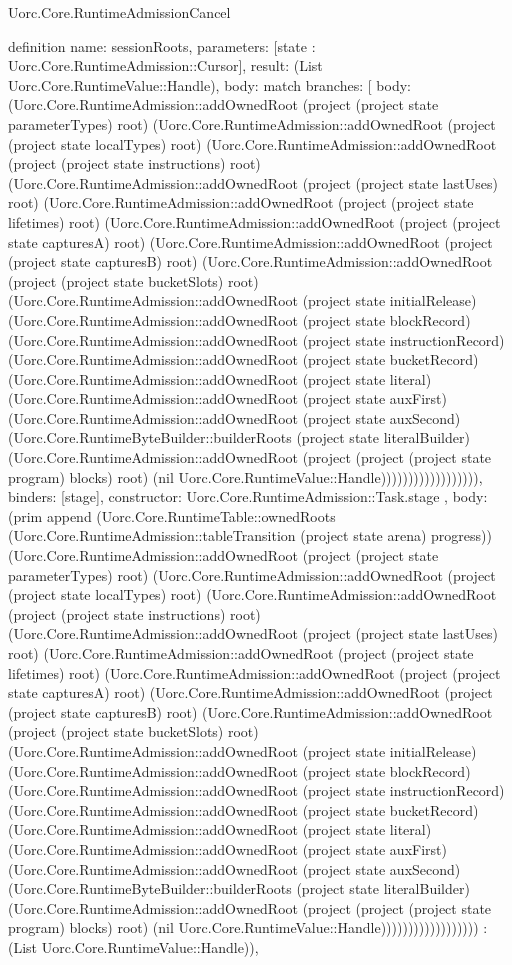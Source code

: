\begin{lexlean}{Uorc.Core.RuntimeAdmissionCancel}
\begin{semanticmodule}
definition{
  name: sessionRoots,
  parameters: [state : Uorc.Core.RuntimeAdmission::Cursor],
  result: (List Uorc.Core.RuntimeValue::Handle),
  body: match{
    branches: [
      {
        body: (Uorc.Core.RuntimeAdmission::addOwnedRoot (project (project state parameterTypes) root) (Uorc.Core.RuntimeAdmission::addOwnedRoot (project (project state localTypes) root) (Uorc.Core.RuntimeAdmission::addOwnedRoot (project (project state instructions) root) (Uorc.Core.RuntimeAdmission::addOwnedRoot (project (project state lastUses) root) (Uorc.Core.RuntimeAdmission::addOwnedRoot (project (project state lifetimes) root) (Uorc.Core.RuntimeAdmission::addOwnedRoot (project (project state capturesA) root) (Uorc.Core.RuntimeAdmission::addOwnedRoot (project (project state capturesB) root) (Uorc.Core.RuntimeAdmission::addOwnedRoot (project (project state bucketSlots) root) (Uorc.Core.RuntimeAdmission::addOwnedRoot (project state initialRelease) (Uorc.Core.RuntimeAdmission::addOwnedRoot (project state blockRecord) (Uorc.Core.RuntimeAdmission::addOwnedRoot (project state instructionRecord) (Uorc.Core.RuntimeAdmission::addOwnedRoot (project state bucketRecord) (Uorc.Core.RuntimeAdmission::addOwnedRoot (project state literal) (Uorc.Core.RuntimeAdmission::addOwnedRoot (project state auxFirst) (Uorc.Core.RuntimeAdmission::addOwnedRoot (project state auxSecond) (Uorc.Core.RuntimeByteBuilder::builderRoots (project state literalBuilder) (Uorc.Core.RuntimeAdmission::addOwnedRoot (project (project (project state program) blocks) root) (nil Uorc.Core.RuntimeValue::Handle)))))))))))))))))),
        binders: [stage],
        constructor: Uorc.Core.RuntimeAdmission::Task.stage
      },
      {
        body: (prim append (Uorc.Core.RuntimeTable::ownedRoots (Uorc.Core.RuntimeAdmission::tableTransition (project state arena) progress)) (Uorc.Core.RuntimeAdmission::addOwnedRoot (project (project state parameterTypes) root) (Uorc.Core.RuntimeAdmission::addOwnedRoot (project (project state localTypes) root) (Uorc.Core.RuntimeAdmission::addOwnedRoot (project (project state instructions) root) (Uorc.Core.RuntimeAdmission::addOwnedRoot (project (project state lastUses) root) (Uorc.Core.RuntimeAdmission::addOwnedRoot (project (project state lifetimes) root) (Uorc.Core.RuntimeAdmission::addOwnedRoot (project (project state capturesA) root) (Uorc.Core.RuntimeAdmission::addOwnedRoot (project (project state capturesB) root) (Uorc.Core.RuntimeAdmission::addOwnedRoot (project (project state bucketSlots) root) (Uorc.Core.RuntimeAdmission::addOwnedRoot (project state initialRelease) (Uorc.Core.RuntimeAdmission::addOwnedRoot (project state blockRecord) (Uorc.Core.RuntimeAdmission::addOwnedRoot (project state instructionRecord) (Uorc.Core.RuntimeAdmission::addOwnedRoot (project state bucketRecord) (Uorc.Core.RuntimeAdmission::addOwnedRoot (project state literal) (Uorc.Core.RuntimeAdmission::addOwnedRoot (project state auxFirst) (Uorc.Core.RuntimeAdmission::addOwnedRoot (project state auxSecond) (Uorc.Core.RuntimeByteBuilder::builderRoots (project state literalBuilder) (Uorc.Core.RuntimeAdmission::addOwnedRoot (project (project (project state program) blocks) root) (nil Uorc.Core.RuntimeValue::Handle)))))))))))))))))) : (List Uorc.Core.RuntimeValue::Handle)),
}}}
\end{semanticmodule}
\end{lexlean}
